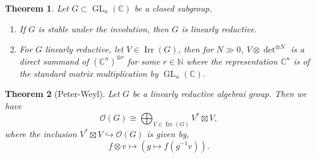 \documentclass[10pt]{article}
\newtheorem{theorem}{Theorem} [section]
\numberwithin{equation}{theorem}
\DeclareMathOperator{\Irr}{Irr}
\DeclareMathOperator{\GL}{GL}
\DeclareMathOperator{\Rep}{Rep}
\newcommand{\defeq}{\vcentcolon=}
\newcommand{\N}[0]{\mathbb{N}}
\newcommand{\Ouv}[0]{\mathcal{O}}
\newcommand{\C}[0]{\mathbb{C}}
\begin{document}
\begin{theorem}
  Let $G\subset\GL_n(\C)$ be a closed subgroup. 
  \begin{enumerate}[1.]
    \item If $G$ is stable under the involution, then $G$ is linearly reductive.
    \item For $G$ linearly reductive, let $V\in\Irr(G)$, then for $N\gg0$, $V\otimes \det^{\otimes N}$ is a direct summand of $(\C^n)^{\otimes r}$ for some $r\in\N$ where the representation $\C^n$ is of the standard matrix multiplication by $\GL_n(\C)$.
  \end{enumerate}
\end{theorem}
\begin{theorem}[Peter-Weyl]
  Let $G$ be a linearly reductive algebrai group. Then we have 
  \begin{equation*}
    \mathcal{O}(G) \cong\bigoplus_{V\in\Irr(G)}V^*\boxtimes V,
  \end{equation*}
  where the inclusion $V^*\boxtimes V\hookrightarrow\Ouv(G)$ is given by,
  \begin{equation*}
    f\otimes v\mapsto(g\mapsto f(g^{-1}v)).
  \end{equation*}
  \label{peter_weyl}
\end{theorem}
\end{document}
